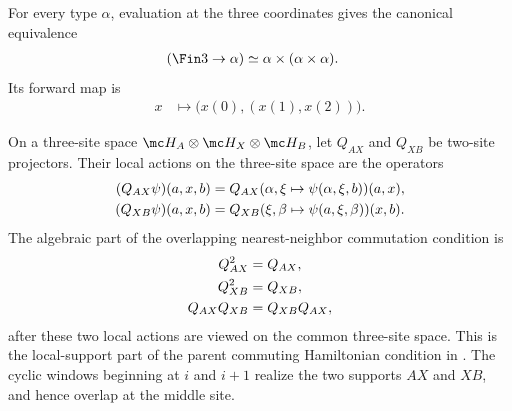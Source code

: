 \begin{definition}
    \label{def:three_coordinate_identification}
    \leanok
    For every type $\alpha$, evaluation at the three coordinates gives the
    canonical equivalence
    \begin{align}
        (\Fin 3\to\alpha) & \simeq\alpha\times(\alpha\times\alpha).
        \label{eq:ph_three_coordinate_equiv}
    \end{align}
    Its forward map is
    \begin{align}
        x & \longmapsto\bigl(x(0),(x(1),x(2))\bigr).
        \label{eq:ph_three_coordinate_forward}
    \end{align}
\end{definition}

\begin{definition}\label{def:overlapping_two_site_supports}
    \leanok
    On a three-site space
    $\mc H_A\otimes\mc H_X\otimes\mc H_B$, let $Q_{AX}$ and $Q_{XB}$ be
    two-site projectors. Their local actions on the three-site space are the
    operators
    \begin{align}
        (Q_{AX}\psi)(a,x,b)
         & =
        Q_{AX}(\alpha,\xi\mapsto\psi(\alpha,\xi,b))(a,x),
        \notag \\
        (Q_{XB}\psi)(a,x,b)
         & =
        Q_{XB}(\xi,\beta\mapsto\psi(a,\xi,\beta))(x,b).
        \notag
    \end{align}
    The algebraic part of the overlapping nearest-neighbor commutation
    condition is
    \begin{align}
        Q_{AX}^2     & =Q_{AX},
        \notag                        \\
        Q_{XB}^2     & =Q_{XB},
        \notag                        \\
        Q_{AX}Q_{XB} & =Q_{XB}Q_{AX},
        \notag
    \end{align}
    after these two local actions are viewed on the common three-site space.
    This is the local-support part of the parent commuting Hamiltonian condition
    in \cite[Definition~D.2]{Cirac2016MPDO_arXiv}. The cyclic windows beginning
    at $i$ and $i+1$ realize the two supports $AX$ and $XB$, and hence overlap at
    the middle site.


\end{definition}

